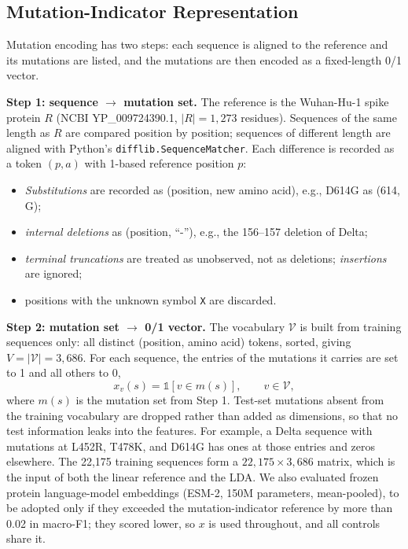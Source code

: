 \documentclass[conference]{IEEEtran}
\begin{document}
\subsection{Mutation-Indicator Representation}
\label{sec:mutations}

Mutation encoding has two steps: each sequence is aligned to the reference and its mutations are listed, and the mutations are then encoded as a fixed-length 0/1 vector.

\textbf{Step 1: sequence $\to$ mutation set.} The reference is the Wuhan-Hu-1 spike protein $R$ (NCBI YP\_009724390.1, $|R|=1{,}273$ residues). Sequences of the same length as $R$ are compared position by position; sequences of different length are aligned with Python's \texttt{difflib.SequenceMatcher}. Each difference is recorded as a token $(p,a)$ with 1-based reference position $p$:
\begin{itemize}
    \item \emph{Substitutions} are recorded as (position, new amino acid), e.g., D614G as (614, G);
    \item \emph{internal deletions} as (position, ``-''), e.g., the 156--157 deletion of Delta;
    \item \emph{terminal truncations} are treated as unobserved, not as deletions; \emph{insertions} are ignored;
    \item positions with the unknown symbol \texttt{X} are discarded.
\end{itemize}

\textbf{Step 2: mutation set $\to$ 0/1 vector.} The vocabulary $\mathcal{V}$ is built from training sequences only: all distinct (position, amino acid) tokens, sorted, giving $V=|\mathcal{V}|=3{,}686$. For each sequence, the entries of the mutations it carries are set to 1 and all others to 0,
\begin{equation}
    x_v(s)=\mathbb{1}[v\in m(s)],\qquad v\in\mathcal{V},
    \label{eq:mutation}
\end{equation}
where $m(s)$ is the mutation set from Step 1. Test-set mutations absent from the training vocabulary are dropped rather than added as dimensions, so that no test information leaks into the features. For example, a Delta sequence with mutations at L452R, T478K, and D614G has ones at those entries and zeros elsewhere. The 22,175 training sequences form a $22{,}175\times3{,}686$ matrix, which is the input of both the linear reference and the LDA.
We also evaluated frozen protein language-model embeddings (ESM-2, 150M parameters, mean-pooled), to be adopted only if they exceeded the mutation-indicator reference by more than 0.02 in macro-F1; they scored lower, so $x$ is used throughout, and all controls share it.
\end{document}
